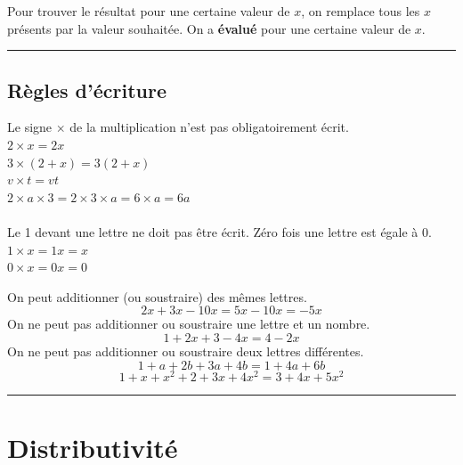 \documentclass[paper=a4, fontsize=9pt]{scrartcl} %
\newcommand{\horrule}[1]{\rule{\linewidth}{#1}} %
\begin{document}
\begin{Proposition}
Pour trouver le résultat pour une certaine valeur de $x$, on remplace tous les $x$ présents par la valeur souhaitée. On a \textbf{évalué} pour une certaine valeur de $x$.
\end{Proposition}

\horrule{1px}

\begin{multicols}{2}

\section{Règles d'écriture}

  \begin{Proposition}
    Le signe $\times$ de la multiplication n'est pas obligatoirement écrit.\\

    $2 \times x          = 2x$\\
    $3 \times (2 + x)    = 3(2 + x)$\\ 
    $v \times t          = vt$\\
    $2 \times a \times 3 = 2 \times 3 \times a = 6 \times a = 6a$\\
    \vspace{0.3cm}\\
    Le 1 devant une lettre ne doit pas être écrit. Zéro fois une lettre est égale à 0. \\
    $1 \times x          = 1x = x$ \\
    $0 \times x          = 0x = 0$
  \end{Proposition} 


  \begin{Proposition}
    On peut additionner (ou soustraire) des mêmes lettres.
    $$2x + 3x - 10x = 5x - 10x = -5x$$
    On ne peut pas additionner ou soustraire une lettre et un nombre.
    $$1 + 2x + 3 - 4x = 4 - 2x$$
    On ne peut pas additionner ou soustraire deux lettres différentes. 
    $$1 + a + 2b + 3a +4b = 1 + 4a + 6b$$
    $$1 + x + x^2 + 2 + 3x + 4x^2 = 3 + 4x + 5x^2$$
  \end{Proposition}

\end{multicols}

\horrule{1px}

\section{Distributivité}
\end{document}
